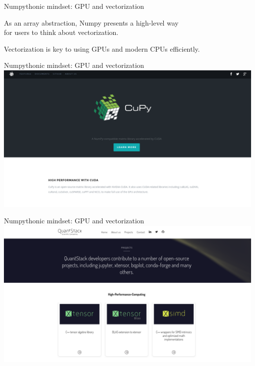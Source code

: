 \documentclass[aspectratio=169]{beamer}
\begin{document}
\begin{frame}{Numpythonic mindset: GPU and vectorization}
\Large
\vspace{0.5 cm}
\begin{center}
As an array abstraction, Numpy presents a high-level way \\ for users to think about vectorization.

\vspace{1 cm}
Vectorization is key to using GPUs and modern CPUs efficiently.
\end{center}
\end{frame}

\begin{frame}{Numpythonic mindset: GPU and vectorization}
\vspace{0.35 cm}
\includegraphics[width=\linewidth]{cupy.png}
\end{frame}

\begin{frame}{Numpythonic mindset: GPU and vectorization}
\vspace{0.35 cm}
\includegraphics[width=\linewidth]{quantstack.png}
\end{frame}
\end{document}
